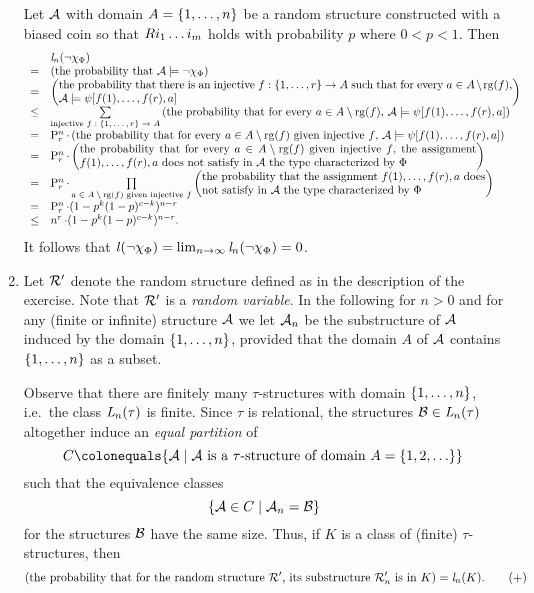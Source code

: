 \begin{enumerate}[1.]
Let $\mathcal{A}$ with domain $A = {\{1, \ldots, n\}}$ be a random structure constructed with a biased coin so that $R i_1 \ldots i_m$ holds with probability $p$ where $0 < p < 1$. Then
\[
\begin{array}{ll}
\    & \lprob[n](\neg\extaxm[\Phi]) \cr
=    & \paren{\mbox{the probability that \mathmode{\strct{A} \satis \neg\extaxm[\Phi]}}} \cr
=    & \paren{\parbox{40em}{the probability that there is an injective \mathmode{f : \sete{1, \etc, r} \to A} such that for every \mathmode{a \in A \setminus \rg(f)}, \mathmode{\strct{A} \satis \psi[f(1), \etc, f(r), a]}}} \cr
\leq & \sum\limits_{\text{injective \mathmode{f : \sete{1, \etc, r} \to A}}} \paren{\mbox{the probability that for every \mathmode{a \in A \setminus \rg(f)}, \mathmode{\strct{A} \satis \psi[f(1), \etc, f(r), a]}}} \cr
=    & \prmt{n}{r} \mul \paren{\mbox{the probability that for every \mathmode{a \in A \setminus \rg(f)} given injective \mathmode{f}, \mathmode{\strct{A} \satis \psi[f(1), \etc, f(r), a]}}} \cr
=    & \prmt{n}{r} \mul \paren{\parbox{35em}{the probability that for every \mathmode{a \in A \setminus \rg(f)} given injective \mathmode{f}, the assignment \mathmode{f(1), \etc, f(r), a} does not satisfy in \mathmode{\strct{A}} the type characterized by \mathmode{\Phi}}} \cr
=    & \prmt{n}{r} \mul \prod\limits_{\text{\mathmode{a \in A \setminus \rg(f)} given injective \mathmode{f}}} \paren{\parbox{25em}{the probability that the assignment \mathmode{f(1), \etc, f(r), a} does not satisfy in \mathmode{\strct{A}} the type characterized by \mathmode{\Phi}}} \cr
=    & \prmt{n}{r} \mul (1 - p^k(1 - p)^{c - k})^{n - r} \cr
\leq & n^r \mul (1 - p^k(1 - p)^{c - k})^{n - r}. \cr
\end{array}
\]
It follows that $\lprob(\neg\extaxm[\Phi]) = \lim_{n \to \infty} \lprob[n](\neg\extaxm[\Phi]) = 0$.
%
\item {} Let $\mathcal{R}'$ denote the random structure defined as in the description of the exercise. Note that $\mathcal{R}'$ is a \emph{random variable}. In the following for $n > 0$ and for any (finite or infinite) structure $\mathcal{A}$ we let $\mathcal{A}_n$ be the substructure of $\mathcal{A}$ induced by the domain ${\{1, \ldots, n\}}$, provided that the domain $A$ of $\mathcal{A}$ contains ${\{1, \ldots, n\}}$ as a subset.

Observe that there are finitely many $\tau$-structures with domain ${\{1, \ldots, n\}}$, i.e.\ the class $\mathit{L}_{n}(\tau)$ is finite. Since $\tau$ is relational, the structures $\mathcal{B} \in \mathit{L}_{n}(\tau)$ altogether induce an \emph{equal partition} of
\[
C \defas \sett{\strct{A}}{\mathmode{\strct{A}} is a \mathmode{\tau}-structure of domain \mathmode{A = \sete{1, 2, \etc}}}
\]
such that the equivalence classes
\[
{\{\mathcal{A} \in C \mid \mathcal{A}_n = \mathcal{B}\}}
\]
for the structures $\mathcal{B}$ have the same size. Thus, if $K$ is a class of (finite) $\tau$-structures, then
\begin{equation}\label{e4_1_8+1}
(\text{the probability that for the random structure \mathmode{\strct{R}'}, its substructure \mathmode{\strct{R}'_n} is in \mathmode{K}}) = \lprob[n](K). \tag{$+$}
\end{equation}


\end{enumerate}

